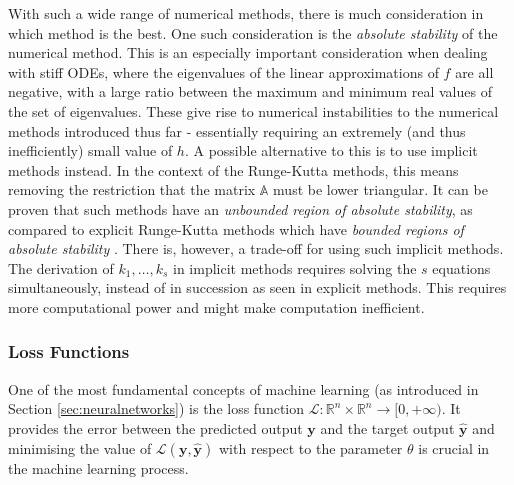 \documentclass[a4paper,11pt,titlepage]{article}
\theoremstyle{definition}
\theoremstyle{plain}
\theoremstyle{remark}
\begin{document}
With such a wide range of numerical methods, there is much consideration in which method is the best. One such consideration is the \textit{absolute stability} of the numerical method. This is an especially important consideration when dealing with stiff ODEs, where the eigenvalues of the linear approximations of $f$ are all negative, with a large ratio between the maximum and minimum real values of the set of eigenvalues. These give rise to numerical instabilities to the numerical methods introduced thus far - essentially requiring an extremely (and thus inefficiently) small value of $h$. A possible alternative to this is to use implicit methods instead. In the context of the Runge-Kutta methods, this means removing the restriction that the matrix $\mathbb{A}$ must be lower triangular. It can be proven that such methods have an \textit{unbounded region of absolute stability}, as compared to explicit Runge-Kutta methods which have \textit{bounded regions of absolute stability} \cite{sulimayers2003}. There is, however, a trade-off for using such implicit methods. The derivation of $k_1, \dots, k_s$ in implicit methods requires solving the $s$ equations simultaneously, instead of in succession as seen in explicit methods. This requires more computational power and might make computation inefficient.

\subsubsection{Loss Functions}

One of the most fundamental concepts of machine learning (as introduced in Section \ref{sec:neuralnetworks}) is the loss function $\mathcal{L}: \mathbb{R}^n \times \mathbb{R}^n \to [0, +\infty )$. It provides the error between the predicted output $\mathbf{y}$ and the target output $\mathbf{\hat{y}}$ and minimising the value of $\mathcal{L}(\mathbf{y}, \mathbf{\hat{y}})$ with respect to the parameter $\theta$ is crucial in the machine learning process. 
\end{document}
